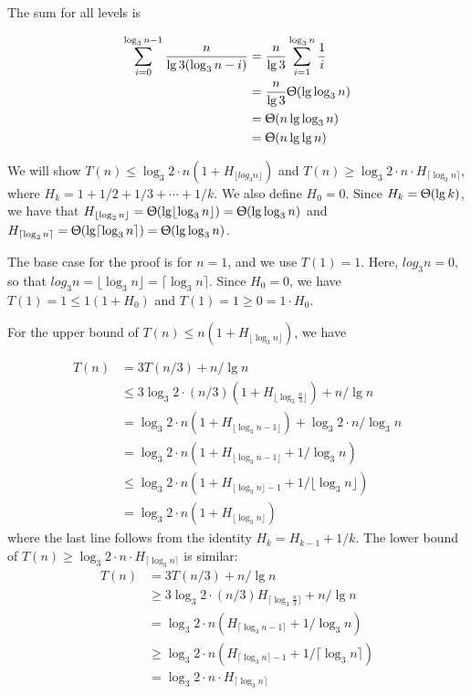 \documentclass{book}
\begin{document}
\begin{CJK}{UTF8}{gkai}
The sum for all levels is

\begin{align*}
\sum_{i=0}^{\log_3 n - 1} \frac{n}{\lg3(\log_3 n - i)} & = \frac{n}{\lg3}\sum_{i=1}^{\log_3 n} \frac{1}{i} \\
& = \frac{n}{\lg3} \Uptheta (\lg\log_3 n) \\
& = \Uptheta(n\lg\log_3 n) \\
& = \Uptheta(n\lg\lg n)
\end{align*}

We will show  $T(n)\le \log_3 2 \cdot n(1 + H_{\lfloor log_3 n \rfloor})$ and 
$T(n)\ge \log_3 2 \cdot n \cdot H_{\lceil \log_3 n \rceil}$,
where $H_k = 1 + 1/2 + 1/3 + \dotsi + 1/k$. We also define $H_0 = 0$.
Since $H_k = \Uptheta(\lg k)$, 
we have that $H_{\lfloor\log_3 n\rfloor} = \Uptheta(\lg\lfloor \log_3 n \rfloor)
= \Uptheta(\lg\log_3 n)$ and $H_{\lceil\log_3 n\rceil} = \Uptheta(\lg\lceil \log_3 n \rceil)
= \Uptheta(\lg\log_3 n)$.

The base case for the proof is for $n=1$, and we use $T(1) = 1$. Here, $log_3 n = 0$, 
so that $log_3 n = \lfloor\log_3 n\rfloor = \lceil\log_3 n\rceil$. Since $H_0 = 0$, we 
have $T(1) = 1 \le 1(1+H_0)$ and $T(1) = 1 \ge 0 = 1 \cdot H_0$.

For the upper bound of $T(n) \le n(1+H_{\lfloor \log_3 n \rfloor})$, we have

\begin{align*}
T(n) & = 3T(n/3) + n /\lg n \\
& \le 3\log_3 2 \cdot (n/3)(1+H_{\lfloor\log_3 \frac{n}{3} \rfloor}) + n/\lg n \\
& = \log_3 2 \cdot n(1+H_{\lfloor\log_3 n - 1\rfloor}) + \log_3 2 \cdot n/\log_3 n \\
& = \log_3 2 \cdot n(1+H_{\lfloor\log_3n -1\rfloor} + 1/\log_3 n) \\
& \le \log_3 2 \cdot n(1+H_{\lfloor \log_3 n \rfloor - 1} + 1/\lfloor \log_3 n \rfloor) \\
& = \log_3 2 \cdot n(1+H_{\lfloor \log_3 n \rfloor})  
\end{align*}
where the last line follows from the identity $H_k = H_{k-1} + 1/k$. 
The lower bound of $T(n)\ge \log_3 2 \cdot n \cdot H_{\lceil \log_3 n \rceil}$ is similar:
\begin{align*}
T(n) & = 3T(n/3) + n/\lg n \\
& \ge 3\log_3 2 \cdot (n/3)H_{\lceil\log_3\frac{n}{3}\rceil} + n/\lg n \\ 
& = \log_3 2 \cdot n(H_{\lceil\log_3 n - 1\rceil} + 1/\log_3 n) \\
& \ge \log_3 2 \cdot n(H_{\lceil\log_3 n\rceil - 1} + 1/\lceil\log_3 n \rceil) \\
& = \log_3 2 \cdot n \cdot H_{\lceil\log_3 n\rceil}
\end{align*}


\end{CJK}
\end{document}
